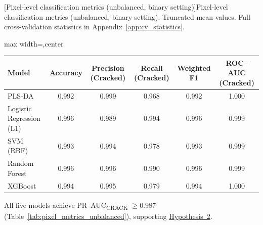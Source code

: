 \begin{landscape}
\begin{minipage}{\linewidth}
    \centering
    [Pixel-level classification metrics (unbalanced, binary setting)]{Pixel-level classification metrics (unbalanced, binary setting). Truncated mean values. Full cross-validation statistics in Appendix~\ref{app:cv_statistics}.}
    \label{tab:pixel_metrics_unbalanced}
    \small
    \renewcommand{\arraystretch}{1.25}
    \setlength{\tabcolsep}{7pt}
    \begin{adjustbox}{max width=\linewidth,center}
    \begin{tabular}{@{}lccccc@{}}
        \toprule
        Model & Accuracy & Precision (Cracked) & Recall (Cracked) & Weighted F1 & ROC--AUC (Cracked) \\
        \midrule
        PLS-DA                    & 0.992 & 0.999 & 0.968 & 0.992 & 1.000 \\
        Logistic Regression (L1)  & 0.996 & 0.989 & 0.994 & 0.996 & 0.999 \\
        SVM (RBF)                 & 0.993 & 0.994 & 0.978 & 0.993 & 0.999 \\
        Random Forest            & 0.996 & 0.996 & 0.990 & 0.996 & 0.999 \\
        XGBoost                  & 0.994 & 0.995 & 0.979 & 0.994 & 1.000 \\
        \bottomrule
    \end{tabular}
    \end{adjustbox}
\end{minipage}

\medskip
\noindent
All five models achieve PR--AUC\textsubscript{CRACK} $\geq 0.987$ (Table~\ref{tab:pixel_metrics_unbalanced}), supporting \hyperref[hyp:pixel_level_feasibility]{Hypothesis~2}.

\end{landscape}

